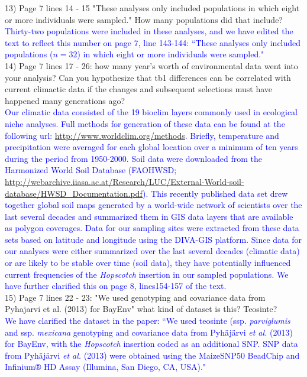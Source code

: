 \documentclass[11pt]{article}
\newcommand{\res}[1]{\noindent \textcolor{blue}{{#1}} \\}
\begin{document}
13) Page 7 lines 14 - 15 "These analyses only included populations in which eight or more individuals were sampled."  How many populations did that include?\\
 
\res{Thirty-two populations were included in these analyses, and we have edited the text to reflect this number on page 7, line 143-144: ``These analyses only included populations ($n = 32$) in which eight or more individuals were sampled."}

14) Page 7 lines 17 - 26: how many year's worth of environmental data went into your analysis? Can you hypothesize that tb1 differences can be correlated with current climactic data if the changes and subsequent selections must have happened many generations ago?\\
 
\res{Our climatic data consisted of the 19 bioclim layers commonly used in ecological niche analyses. Full methods for generation of these data can be found at the following url: \url{http://www.worldclim.org/methods}. Briefly, temperature and precipitation were averaged for each global location over a minimum of ten years during the period from 1950-2000.  Soil data were downloaded from the Harmonized World Soil Database (FAOHWSD; \url{http://webarchive.iiasa.ac.at/Research/LUC/External-World-soil-database/HWSD_Documentation.pdf}). This recently published data set drew together global soil maps generated by a world-wide network of scientists over the last several decades and summarized them in GIS data layers that are available as polygon coverages. Data for our sampling sites were extracted from these data sets based on latitude and longitude using the DIVA-GIS platform. Since data for our analyses were either summarized over the last several decades (climatic data) or are likely to be stable over time (soil data), they have potentially influenced current frequencies of the \emph{Hopscotch} insertion in our sampled populations. We have further clarified this on page 8, lines154-157 of the text.} 

15) Page 7 lines 22 - 23: "We used genotyping and covariance data from Pyhajarvi et al. (2013) for BayEnv" what kind of dataset is this? Teosinte?\\ 

\res{We have clarified the dataset in the paper: ``We used teosinte (ssp. \emph{parviglumis} and ssp. \emph{mexicana} genotyping and covariance data from Pyh{\"a}j{\"a}rvi \emph{et al.} (2013) for BayEnv, with the \emph{Hopscotch} insertion coded as an additional SNP. SNP data from Pyh{\"a}j{\"a}rvi \emph{et al.} (2013) were obtained using the MaizeSNP50 BeadChip and Infinium® HD Assay (Illumina, San Diego, CA, USA)."}
\end{document}
